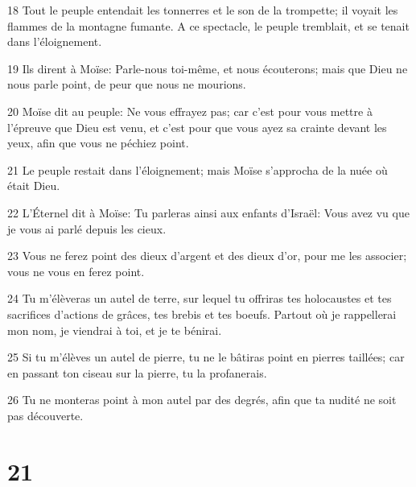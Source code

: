 \par 18 Tout le peuple entendait les tonnerres et le son de la trompette; il voyait les flammes de la montagne fumante. A ce spectacle, le peuple tremblait, et se tenait dans l'éloignement.
\par 19 Ils dirent à Moïse: Parle-nous toi-même, et nous écouterons; mais que Dieu ne nous parle point, de peur que nous ne mourions.
\par 20 Moïse dit au peuple: Ne vous effrayez pas; car c'est pour vous mettre à l'épreuve que Dieu est venu, et c'est pour que vous ayez sa crainte devant les yeux, afin que vous ne péchiez point.
\par 21 Le peuple restait dans l'éloignement; mais Moïse s'approcha de la nuée où était Dieu.
\par 22 L'Éternel dit à Moïse: Tu parleras ainsi aux enfants d'Israël: Vous avez vu que je vous ai parlé depuis les cieux.
\par 23 Vous ne ferez point des dieux d'argent et des dieux d'or, pour me les associer; vous ne vous en ferez point.
\par 24 Tu m'élèveras un autel de terre, sur lequel tu offriras tes holocaustes et tes sacrifices d'actions de grâces, tes brebis et tes boeufs. Partout où je rappellerai mon nom, je viendrai à toi, et je te bénirai.
\par 25 Si tu m'élèves un autel de pierre, tu ne le bâtiras point en pierres taillées; car en passant ton ciseau sur la pierre, tu la profanerais.
\par 26 Tu ne monteras point à mon autel par des degrés, afin que ta nudité ne soit pas découverte.

\chapter{21}

